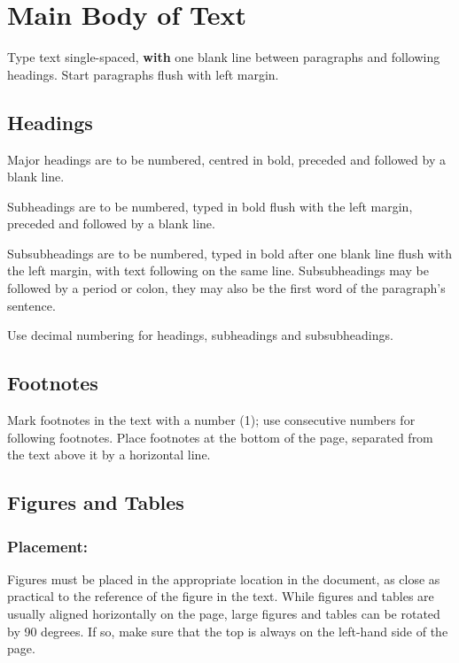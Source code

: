 \documentclass{isprs} %
\begin{document}
\section{Main Body of Text}\label{sec:MAIN BODY OF TEXT}

Type text single-spaced, \textbf{with} one blank line between paragraphs and 
following headings. Start paragraphs flush with left margin.


\subsection{Headings}\label{sec:Headings}


Major headings are to be numbered, centred in bold, preceded and followed by a blank line.

Subheadings are to be numbered, typed in bold flush with the left margin, preceded and followed by a blank line. 

Subsubheadings are to be numbered, typed in bold after one blank line flush with the left margin, with text following on the same line. Subsubheadings may be followed by a period or colon, they may also be the first word of the paragraph's sentence.

Use decimal numbering for headings, subheadings and subsubheadings.


\subsection{Footnotes}\label{sec:Footnotes}

Mark footnotes in the text with a number (1); use consecutive numbers for following footnotes. Place footnotes at the bottom of the page, separated from the text above it by a horizontal line.


\subsection{Figures and Tables}\label{sec:Illustrations and Tables}

\subsubsection{Placement:}\label{sec:Placement}

Figures must be placed in the appropriate location in the document, as close as practical to the reference of the figure in the text. While figures and tables are usually aligned horizontally on the page, large figures and tables can be rotated by 90 degrees. If so, make sure that the top is always on the left-hand side of the page.
\end{document}
